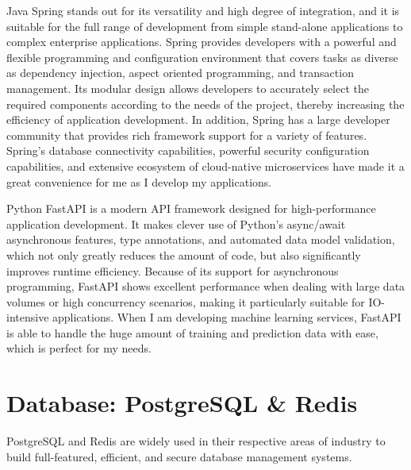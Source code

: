 \documentclass[12pt,two side]{report}
\begin{document}
Java Spring stands out for its versatility and high degree of integration, and it is suitable for the full range of development from simple stand-alone applications to complex enterprise applications\cite{SpringFramework}. Spring provides developers with a powerful and flexible programming and configuration environment that covers tasks as diverse as dependency injection, aspect oriented programming, and transaction management. Its modular design allows developers to accurately select the required components according to the needs of the project, thereby increasing the efficiency of application development\cite{SpringFramework}. In addition, Spring has a large developer community that provides rich framework support for a variety of features\cite{SpringFramework}. Spring's database connectivity capabilities, powerful security configuration capabilities, and extensive ecosystem of cloud-native microservices have made it a great convenience for me as I develop my applications.\newline

Python FastAPI is a modern API framework designed for high-performance application development. It makes clever use of Python's async/await asynchronous features, type annotations, and automated data model validation, which not only greatly reduces the amount of code, but also significantly improves runtime efficiency\cite{fastapi_website}. Because of its support for asynchronous programming, FastAPI shows excellent performance when dealing with large data volumes or high concurrency scenarios, making it particularly suitable for IO-intensive applications\cite{fastapi_website}. When I am developing machine learning services, FastAPI is able to handle the huge amount of training and prediction data with ease, which is perfect for my needs.

\section{Database: PostgreSQL \& Redis}
PostgreSQL and Redis are widely used in their respective areas of industry to build full-featured, efficient, and secure database management systems.\newline
\end{document}

